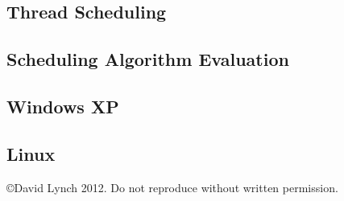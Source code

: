 \documentclass[10pt,a4paper]{article}
\begin{document}
\subsection{Thread Scheduling}
\subsection{Scheduling Algorithm Evaluation}
\subsection{Windows XP}
\subsection{Linux}



{}

\begin{center}
{\small \copyright  David Lynch 2012. Do not reproduce without written permission.}
\end{center}
\end{document}
